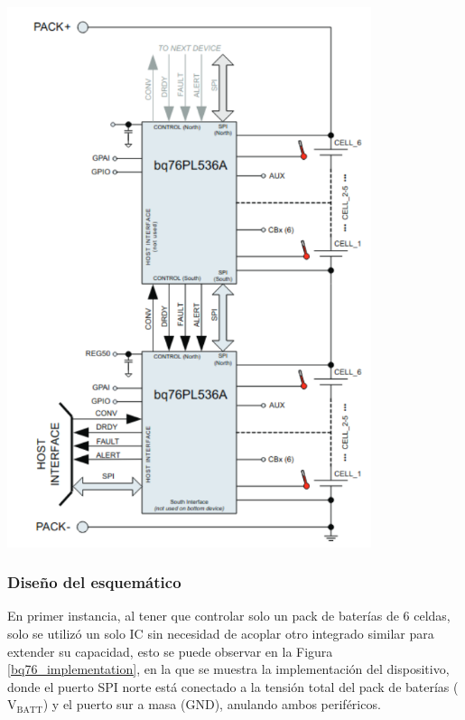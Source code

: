 \documentclass[10pt, a4paper]{article}
\begin{document}
\begin{minipage}{0.5\textwidth}
    \begin{center}
        \includegraphics[width=0.8\textwidth]{bq76_simplified_schematic.png}
        \label{bq76_simplified_schematic}
    \end{center}
\end{minipage}

\subsubsection{Diseño del esquem\'atico}

En primer instancia, al tener que controlar solo un pack de bater\'ias de 6
celdas, solo se utiliz\'o un solo \acrshort{IC} sin necesidad de acoplar otro
integrado similar para extender su capacidad, esto se puede observar en la
Figura \ref{bq76_implementation}, en la que se muestra la implementaci\'on del
dispositivo, donde el puerto SPI norte est\'a conectado a la tensi\'on total del 
pack de bater\'ias ($\mathrm{V_{BATT}}$) y el puerto sur a masa 
($\mathrm{GND}$), anulando ambos perif\'ericos.
\end{document}
